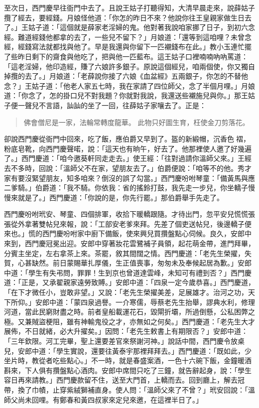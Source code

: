 至次日，西門慶早往衙門中去了。且說王姑子打聽得知，大清早晨走來，說薛姑子攬了經去，要經錢。月娘怪他道：「你怎的昨日不來？他說你往王皇親家做生日去了。」王姑子道：「這個就是薛家老淫婦的鬼。他對著我說咱家挪了日子，到初六念經。難道經錢他都拿的去了，一些兒不留下？」月娘道：「還等到這咱哩？未曾念經，經錢寫法就都找與他了。早是我還與你留下一匹襯錢布在此。」教小玉連忙擺了些昨日剩下的齋食與他吃了，把與他一匹藍布。這王姑子口裡喃喃吶吶罵道：「這老淫婦，他印造經，賺了六娘許多銀子。原說這個經兒，咱兩個使，你又獨自掉攬的去了。」月娘道：「老薛說你接了六娘《血盆經》五兩銀子，你怎的不替他念？」王姑子道：「他老人家五七時，我在家請了四位師父，念了半個月哩。」月娘道：「你念了，怎的掛口兒不對我題？你就對我說，我還送些襯施兒與你。」那王姑子便一聲兒不言語，訕訕的坐了一回，往薛姑子家嚷去了。正是：
\begin{quote}
佛會僧尼是一家，法輪常轉度龍華。
此物只好圖生育，枉使金刀剪落花。
\end{quote}

卻說西門慶從衙門中回來，吃了飯，應伯爵又早到了。盔的新緞帽，沉香色𧜽褶，粉底皂靴，向西門慶聲喏，說：「這天也有晌午，好去了。他那裡使人邀了好幾遍了。」西門慶道：「咱今邀葵軒同走走去。」使王經：「往對過請你溫師父來。」王經去不多時，回說：「溫師父不在家，望朋友去了。」伯爵便說：「咱等不的他。秀才家有要沒緊望朋友，知多咱來？倒沒的誤了勾當。」西門慶吩咐琴童：「備黃馬與應二爹騎。」伯爵道：「我不騎。你依我：省的搖鈴打鼓，我先走一步兒，你坐轎子慢慢來就是了。」西門慶道：「你說的是，你先行罷。」那伯爵舉手先走了。

西門慶吩咐玳安、琴童、四個排軍，收拾下暖轎跟隨。才待出門，忽平安兒慌慌張張從外拿著雙帖兒來報，說：「工部安老爹來拜。先差了個吏送帖兒，後邊轎子便來也。」慌的西門慶吩咐家中廚下備飯，使來興兒買攢盤點心伺候。良久，安郎中來到，西門慶冠冕出迎。安郎中穿著妝花雲鷺補子員領，起花萌金帶，進門拜畢，分賓主坐定，左右拿茶上來。茶罷，敘其間闊之情。西門慶道：「老先生榮擢，失賀，心甚缺然。前日蒙賜華扎厚儀，生正值喪事，匆匆未及奉候起居為歉。」安郎中道：「學生有失弔問，罪罪！生到京也曾道達雲峰，未知可有禮到否？」西門慶道：「正是，又承翟親家遠勞致賻。」安郎中道：「四泉一定今歲恭喜。」西門慶道，「在下才微任小，豈敢非望。」又說：「老先生榮擢美差，足展雄才。治河之功，天下所仰。」安郎中道：「蒙四泉過譽。一介寒儒，辱蔡老先生抬舉，謬典水利，修理河道，當此民窮財盡之時。前者皇船載運花石，毀閘折壩，所過倒懸，公私困弊之極。又兼賊盜梗阻，雖有神輸鬼役之才，亦無如之何矣。」西門慶道：「老先生大才展佈，不日就緒，必大升擢矣。」因問：「老先生敕書上有期限否？」安郎中道：「三年欽限。河工完畢，聖上還要差官來祭謝河神。」說話中間，西門慶令放桌兒，安郎中道：「學生實說，還要往黃泰宇那裡拜拜去。」西門慶道：「既如此，少坐片時，教從者吃些點心。」不一時，就是春盛案酒，一色十六碗下飯，金鐘暖酒斟來，下人俱有攢盤點心酒肉。安郎中席間只吃了三鐘，就告辭起身，說：「學生容日再來請教。」西門慶款留不住，送至大門首，上轎而去。回到廳上，解去冠帶，換了巾幘，止穿紫絨獅補直身。使人問：「溫師父來了不曾？」玳安回說：「溫師父尚未回哩。有鄭春和黃四叔家來定兒來邀，在這裡半日了。」


